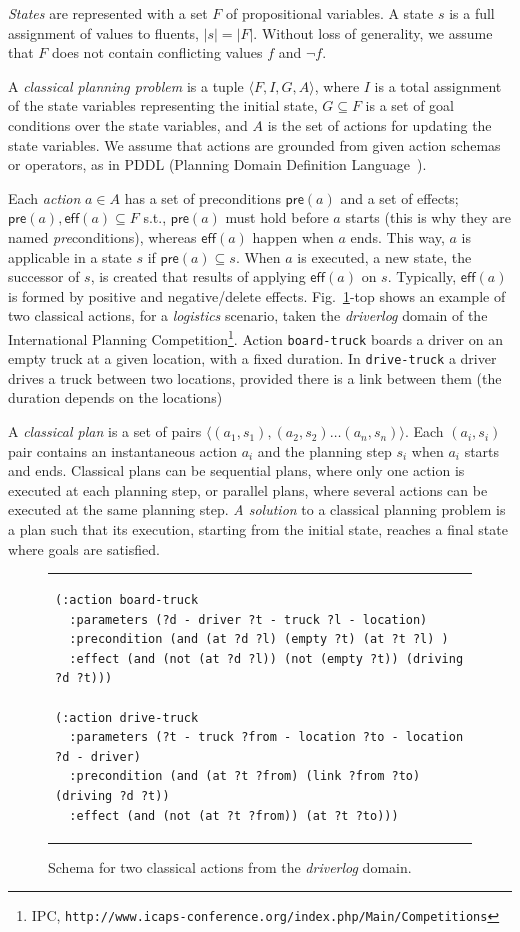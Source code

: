 \documentclass[runningheads]{llncs}
\newcommand{\tup}[1]{{\langle #1 \rangle}}
\newcommand{\pre}{\mathsf{pre}}    %
\newcommand{\eff}{\mathsf{eff}}    %
\begin{document}
{\em States} are represented with a set $F$ of propositional variables. A state $s$ is a full assignment of values to fluents, $|s|=|F|$. Without loss of generality, we assume that $F$ does not contain conflicting values $f$ and $\neg f$.

A {\em classical planning problem} is a tuple $\tup{F,I,G,A}$, where $I$ is a total assignment of the state variables representing the initial state, $G \subseteq F$ is a set of goal conditions over the state variables, and $A$ is the set of actions for updating the state variables. We assume that actions are grounded from given action schemas or operators, as in PDDL (Planning Domain Definition Language~\cite{fox2003pddl2}).

Each {\em action} $a \in A$ has a set of preconditions $\pre(a)$ and a set of effects; $\pre(a), \eff(a) \subseteq F$ s.t., $\pre(a)$ must hold before $a$ starts (this is why they are named \emph{pre}conditions), whereas $\eff(a)$ happen when $a$ ends. This way, $a$ is applicable in a state $s$ if $\pre(a) \subseteq s$. When $a$ is executed, a new state, the successor of $s$, is created that results of applying $\eff(a)$ on $s$. Typically, $\eff(a)$ is formed by positive and negative/delete effects. Fig.~\ref{fig:exampleactions1}-top shows an example of two classical actions, for a {\em logistics} scenario, taken the \emph{driverlog} domain of the International Planning Competition\footnote{IPC, \texttt{http://www.icaps-conference.org/index.php/Main/Competitions}}. Action \texttt{board-truck} boards a driver on an empty truck at a given location, with a fixed duration. In \texttt{drive-truck} a driver drives a truck between two locations, provided there is a link between them (the duration depends on the locations)

A {\em classical plan} is a set of pairs $\tup{(a_1,s_1),(a_2,s_2)\ldots (a_n,s_n)}$. Each $(a_i,s_i)$ pair contains an instantaneous action $a_i$ and the planning step $s_i$ when $a_i$ starts and ends. Classical plans can be sequential plans, where only one action is executed at each planning step, or parallel plans, where several actions can be executed at the same planning step. {\em A solution} to a classical planning problem is a plan such that its execution, starting from the initial state, reaches a final state where goals are satisfied.


\begin{figure}
\begin{tabular}{p{\textwidth}}
\begin{verbatim}
(:action board-truck
  :parameters (?d - driver ?t - truck ?l - location)
  :precondition (and (at ?d ?l) (empty ?t) (at ?t ?l) )
  :effect (and (not (at ?d ?l)) (not (empty ?t)) (driving ?d ?t)))

(:action drive-truck
  :parameters (?t - truck ?from - location ?to - location ?d - driver)
  :precondition (and (at ?t ?from) (link ?from ?to) (driving ?d ?t))
  :effect (and (not (at ?t ?from)) (at ?t ?to)))
\end{verbatim}
\end{tabular}
\label{fig:exampleactions1}
\caption{\small Schema for two classical actions from the {\em driverlog} domain.}
\end{figure}
\end{document}
